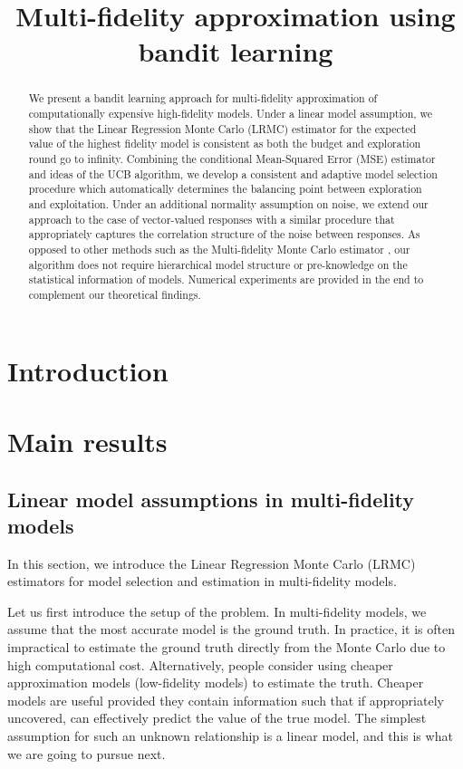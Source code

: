 \documentclass[11pt,a4paper]{amsart}
\numberwithin{equation}{section}
\theoremstyle{plain}
\theoremstyle{definition}
\begin{document}
\date{}

\title{Multi-fidelity approximation using bandit learning}
\maketitle

\begin{abstract}
We present a bandit learning approach for multi-fidelity approximation of computationally expensive high-fidelity models. 
Under a linear model assumption, we show that the Linear Regression Monte Carlo (LRMC) estimator for the expected value of the highest fidelity model is consistent as both the budget and exploration round go to infinity. 
Combining the conditional Mean-Squared Error (MSE) estimator and ideas of the UCB algorithm,
we develop a consistent and adaptive model selection procedure which automatically determines the balancing point between exploration and exploitation. 
Under an additional normality assumption on noise, we extend our approach to the case of vector-valued responses with a similar procedure that appropriately captures the correlation structure of the noise between responses. 
As opposed to other methods such as the Multi-fidelity Monte Carlo estimator \cite{Peherstorfer_2016}, our algorithm does not require hierarchical model structure or pre-knowledge on the statistical information of models.  
Numerical experiments are provided in the end to complement our theoretical findings.
\end{abstract}


\tableofcontents

\section{Introduction}

\section{Main results}

\subsection{Linear model assumptions in multi-fidelity models}
In this section, we introduce the Linear Regression Monte Carlo (LRMC) estimators for model selection and estimation in multi-fidelity models. 

Let us first introduce the setup of the problem.
In multi-fidelity models, we assume that the most accurate model is the ground truth.
In practice, it is often impractical to estimate the ground truth directly from the Monte Carlo due to high computational cost. 
Alternatively, people consider using cheaper approximation models (low-fidelity models) to estimate the truth. 
Cheaper models are useful provided they contain information such that if appropriately uncovered, can effectively predict the value of the true model. 
The simplest assumption for such an unknown relationship is a linear model, and this is what we are going to pursue next. 
\end{document}
